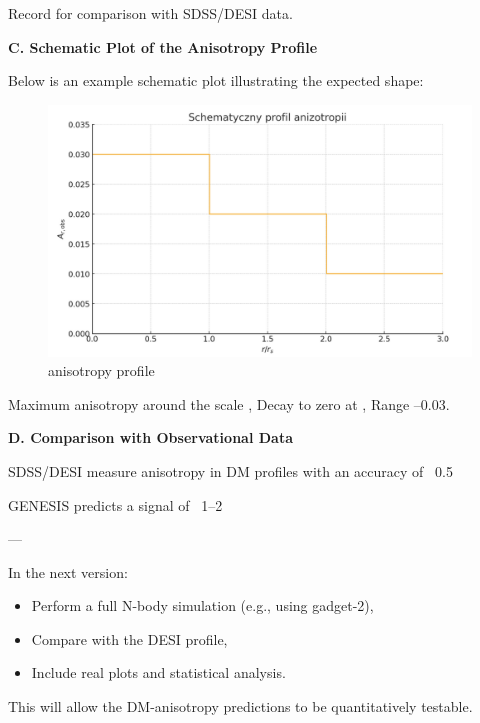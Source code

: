 \documentclass{article}
\begin{document}
Record  for comparison with SDSS/DESI data.

\textbf{C. Schematic Plot of the Anisotropy Profile}

Below is an example schematic plot illustrating the expected shape:

\begin{figure}
    \centering
    \includegraphics[width=0.5\linewidth]{AnisotropyProfile.png}
    \caption{anisotropy profile}
    \label{fig:enter-label}
\end{figure}

Maximum anisotropy around the scale ,  
Decay to zero at ,  
Range –0.03.  

\textbf{D. Comparison with Observational Data}

SDSS/DESI measure anisotropy in DM profiles with an accuracy of ~0.5%

GENESIS predicts a signal of ~1–2%

---

In the next version:

\begin{itemize}
  \item Perform a full N-body simulation (e.g., using gadget-2),  
  \item Compare  with the DESI profile,  
  \item Include real plots and statistical analysis.  
\end{itemize}

This will allow the DM-anisotropy predictions to be quantitatively testable.

\medskip
\begin{center}
\end{center}
\medskip
\end{document}
